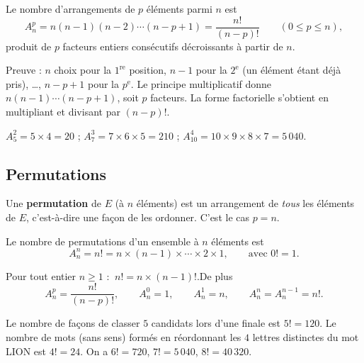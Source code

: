 \begin{theoreme}
Le nombre d'arrangements de $p$ éléments parmi $n$ est
\[
A_n^{p}=n(n-1)(n-2)\cdots(n-p+1)=\frac{n!}{(n-p)!}\qquad(0\le p\le n),
\]
produit de $p$ facteurs entiers consécutifs décroissants à partir de $n$.
\end{theoreme}

\begin{remarque}
Preuve : $n$ choix pour la $1^{\text{re}}$ position, $n-1$ pour la $2^{\text{e}}$ (un
élément étant déjà pris), \dots, $n-p+1$ pour la $p^{\text{e}}$. Le principe multiplicatif
donne $n(n-1)\cdots(n-p+1)$, soit $p$ facteurs. La forme factorielle s'obtient en
multipliant et divisant par $(n-p)!$.
\end{remarque}

\begin{exemple}
$A_5^{2}=5\times 4=20$ ; $A_7^{3}=7\times 6\times 5=210$ ; $A_{10}^{4}=10\times 9\times 8\times 7=5\,040$.
\end{exemple}

\subsection{Permutations}

\begin{definition}[Permutation]
Une \textbf{permutation} de $E$ (à $n$ éléments) est un arrangement de \emph{tous} les éléments de $E$, c'est-à-dire une façon de les ordonner. C'est le cas $p=n$.
\end{definition}

\begin{theoreme}
Le nombre de permutations d'un ensemble à $n$ éléments est
\[
A_n^{n}=n!=n\times(n-1)\times\cdots\times 2\times 1,\qquad\text{avec }0!=1.
\]
\end{theoreme}

\begin{propriete}
Pour tout entier $n\ge1$ : $\ n!=n\times(n-1)!$.\quad De plus
\[
A_n^{p}=\frac{n!}{(n-p)!},\qquad A_n^{0}=1,\qquad A_n^{1}=n,\qquad A_n^{n}=A_n^{n-1}=n!.
\]
\end{propriete}

\begin{exemple}
Le nombre de façons de classer $5$ candidats lors d'une finale est $5!=120$. Le nombre de mots (sans sens) formés en réordonnant les $4$ lettres distinctes du mot LION est $4!=24$. On a $6!=720$, $7!=5\,040$, $8!=40\,320$.
\end{exemple}


